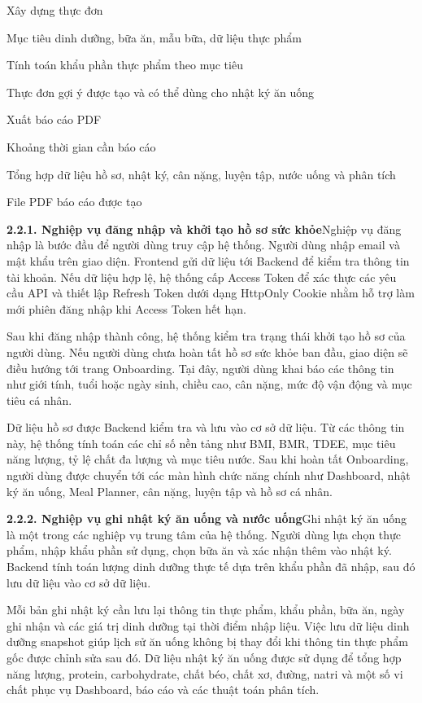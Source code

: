 Xây dựng thực đơn

Mục tiêu dinh dưỡng, bữa ăn, mẫu bữa, dữ liệu thực phẩm

Tính toán khẩu phần thực phẩm theo mục tiêu

Thực đơn gợi ý được tạo và có thể dùng cho nhật ký ăn uống

Xuất báo cáo PDF

Khoảng thời gian cần báo cáo

Tổng hợp dữ liệu hồ sơ, nhật ký, cân nặng, luyện tập, nước uống và phân tích

File PDF báo cáo được tạo

\textbf{2.2.1. Nghiệp vụ đăng nhập và khởi tạo hồ sơ sức khỏe}Nghiệp vụ đăng nhập là bước đầu để người dùng truy cập hệ thống. Người dùng nhập email và mật khẩu trên giao diện. Frontend gửi dữ liệu tới Backend để kiểm tra thông tin tài khoản. Nếu dữ liệu hợp lệ, hệ thống cấp Access Token để xác thực các yêu cầu API và thiết lập Refresh Token dưới dạng HttpOnly Cookie nhằm hỗ trợ làm mới phiên đăng nhập khi Access Token hết hạn.

Sau khi đăng nhập thành công, hệ thống kiểm tra trạng thái khởi tạo hồ sơ của người dùng. Nếu người dùng chưa hoàn tất hồ sơ sức khỏe ban đầu, giao diện sẽ điều hướng tới trang Onboarding. Tại đây, người dùng khai báo các thông tin như giới tính, tuổi hoặc ngày sinh, chiều cao, cân nặng, mức độ vận động và mục tiêu cá nhân.

Dữ liệu hồ sơ được Backend kiểm tra và lưu vào cơ sở dữ liệu. Từ các thông tin này, hệ thống tính toán các chỉ số nền tảng như BMI, BMR, TDEE, mục tiêu năng lượng, tỷ lệ chất đa lượng và mục tiêu nước. Sau khi hoàn tất Onboarding, người dùng được chuyển tới các màn hình chức năng chính như Dashboard, nhật ký ăn uống, Meal Planner, cân nặng, luyện tập và hồ sơ cá nhân.

\textbf{2.2.2. Nghiệp vụ ghi nhật ký ăn uống và nước uống}Ghi nhật ký ăn uống là một trong các nghiệp vụ trung tâm của hệ thống. Người dùng lựa chọn thực phẩm, nhập khẩu phần sử dụng, chọn bữa ăn và xác nhận thêm vào nhật ký. Backend tính toán lượng dinh dưỡng thực tế dựa trên khẩu phần đã nhập, sau đó lưu dữ liệu vào cơ sở dữ liệu.

Mỗi bản ghi nhật ký cần lưu lại thông tin thực phẩm, khẩu phần, bữa ăn, ngày ghi nhận và các giá trị dinh dưỡng tại thời điểm nhập liệu. Việc lưu dữ liệu dinh dưỡng snapshot giúp lịch sử ăn uống không bị thay đổi khi thông tin thực phẩm gốc được chỉnh sửa sau đó. Dữ liệu nhật ký ăn uống được sử dụng để tổng hợp năng lượng, protein, carbohydrate, chất béo, chất xơ, đường, natri và một số vi chất phục vụ Dashboard, báo cáo và các thuật toán phân tích.

